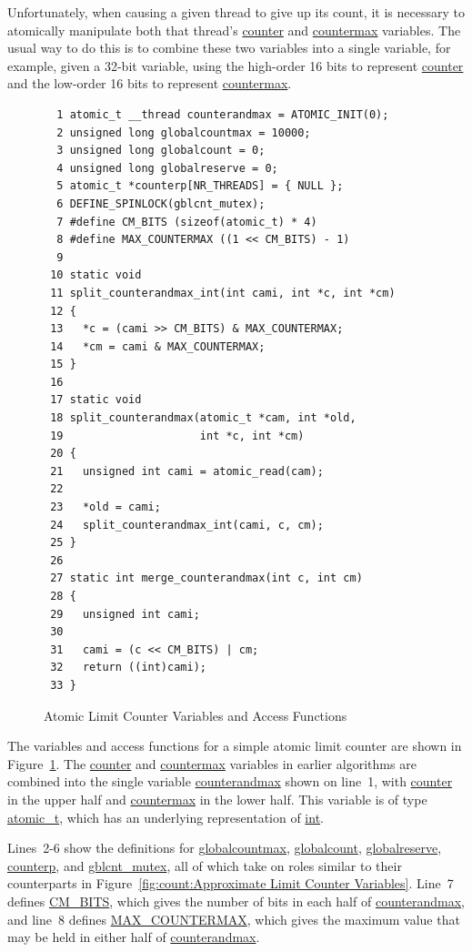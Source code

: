 Unfortunately, when causing a given thread to give up its count, it is
necessary to atomically manipulate both that thread's \url{counter}
and \url{countermax} variables.
The usual way to do this is to combine these two variables into a
single variable,
for example, given a 32-bit variable, using the high-order 16 bits to
represent \url{counter} and the low-order 16 bits to represent
\url{countermax}.

\begin{figure}[tbp]
{ \scriptsize
\begin{verbatim}
  1 atomic_t __thread counterandmax = ATOMIC_INIT(0);
  2 unsigned long globalcountmax = 10000;
  3 unsigned long globalcount = 0;
  4 unsigned long globalreserve = 0;
  5 atomic_t *counterp[NR_THREADS] = { NULL };
  6 DEFINE_SPINLOCK(gblcnt_mutex);
  7 #define CM_BITS (sizeof(atomic_t) * 4)
  8 #define MAX_COUNTERMAX ((1 << CM_BITS) - 1)
  9 
 10 static void
 11 split_counterandmax_int(int cami, int *c, int *cm)
 12 {
 13   *c = (cami >> CM_BITS) & MAX_COUNTERMAX;
 14   *cm = cami & MAX_COUNTERMAX;
 15 }
 16 
 17 static void
 18 split_counterandmax(atomic_t *cam, int *old,
 19                     int *c, int *cm)
 20 {
 21   unsigned int cami = atomic_read(cam);
 22 
 23   *old = cami;
 24   split_counterandmax_int(cami, c, cm);
 25 }
 26 
 27 static int merge_counterandmax(int c, int cm)
 28 {
 29   unsigned int cami;
 30 
 31   cami = (c << CM_BITS) | cm;
 32   return ((int)cami);
 33 }
\end{verbatim}
}
\caption{Atomic Limit Counter Variables and Access Functions}
\label{fig:count:Atomic Limit Counter Variables and Access Functions}
\end{figure}

The variables and access functions for a simple atomic limit counter
are shown in
Figure~\ref{fig:count:Atomic Limit Counter Variables and Access Functions}.
The \url{counter} and \url{countermax} variables in earlier algorithms
are combined into the single variable \url{counterandmax} shown on
line~1, with \url{counter} in the upper half and \url{countermax} in
the lower half.
This variable is of type \url{atomic_t}, which has an underlying
representation of \url{int}.

Lines~2-6 show the definitions for \url{globalcountmax}, \url{globalcount},
\url{globalreserve}, \url{counterp}, and \url{gblcnt_mutex}, all of which
take on roles similar to their counterparts in
Figure~\ref{fig:count:Approximate Limit Counter Variables}.
Line~7 defines \url{CM_BITS}, which gives the number of bits in each half
of \url{counterandmax}, and line~8 defines \url{MAX_COUNTERMAX}, which
gives the maximum value that may be held in either half of
\url{counterandmax}.


